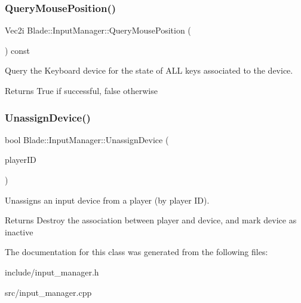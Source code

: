 \subsubsection{\texorpdfstring{Query\+Mouse\+Position()}{QueryMousePosition()}}
{\footnotesize\ttfamily Vec2i Blade\+::\+Input\+Manager\+::\+Query\+Mouse\+Position (\begin{DoxyParamCaption}{ }\end{DoxyParamCaption}) const\hspace{0.3cm}{\ttfamily [noexcept]}}



Query the Keyboard device for the state of A\+LL keys associated to the device. 

\begin{DoxyReturn}{Returns}
True if successful, false otherwise 
\end{DoxyReturn}
\mbox{\label{class_blade_1_1_input_manager_a13f1624084d79930b4ad6c6615277a5b}} 
\subsubsection{\texorpdfstring{Unassign\+Device()}{UnassignDevice()}}
{\footnotesize\ttfamily bool Blade\+::\+Input\+Manager\+::\+Unassign\+Device (\begin{DoxyParamCaption}\item[{Joypad\+Number}]{player\+ID }\end{DoxyParamCaption})}



Unassigns an input device from a player (by player ID). 

\begin{DoxyReturn}{Returns}
Destroy the association between player and device, and mark device as inactive 
\end{DoxyReturn}


The documentation for this class was generated from the following files\+:\begin{DoxyCompactItemize}
\item 
include/input\+\_\+manager.\+h\item 
src/input\+\_\+manager.\+cpp\end{DoxyCompactItemize}

